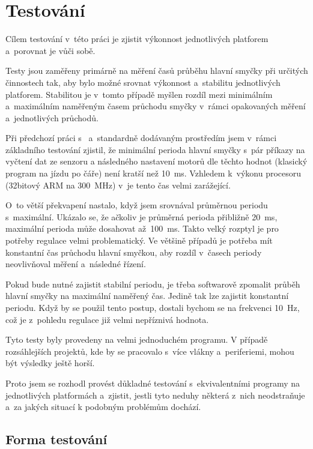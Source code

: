 \chapter{Testování}

Cílem testování v~této práci je zjistit výkonnost jednotlivých platforem a~porovnat je vůči sobě. 

Testy jsou zaměřeny primárně na měření časů průběhu hlavní smyčky při určitých činnostech tak, aby bylo možné srovnat výkonnost a~stabilitu jednotlivých platforem. 
Stabilitou je v~tomto případě myšlen rozdíl mezi minimálním a~maximálním naměřeným časem průchodu smyčky v~rámci opakovaných měření a~jednotlivých průchodů.

Při předchozí práci s~\EVthree{ } a~standardně dodávaným prostředím jsem v~rámci základního testování zjistil, že minimální perioda hlavní smyčky s~pár příkazy na vyčtení dat ze senzoru a následného nastavení motorů dle těchto hodnot (klasický program na jízdu po čáře) není kratší než 10~ms. 
Vzhledem k~výkonu procesoru (32bitový ARM na 300~MHz) v~\EVthree{ }je tento čas velmi zarážející. 

O~to větší překvapení nastalo, když jsem srovnával průměrnou periodu s~maximální. Ukázalo se, že ačkoliv je průměrná perioda přibližně 20~ms, maximální perioda může dosahovat až~100~ms. 
Takto velký rozptyl je pro potřeby regulace velmi problematický. 
Ve většině případů je potřeba mít konstantní čas průchodu hlavní smyčkou, aby rozdíl v~časech periody neovlivňoval měření a~následné řízení. 

Pokud bude nutné zajistit stabilní periodu, je třeba softwarově zpomalit průběh hlavní smyčky na maximální naměřený čas. 
Jedině tak lze zajistit konstantní periodu. 
Když by se použil tento postup, dostali bychom se na frekvenci 10~Hz, což je z~pohledu regulace již velmi nepříznivá hodnota.

Tyto testy byly provedeny na velmi jednoduchém programu. 
V případě rozsáhlejších projektů, kde by se pracovalo s~více vlákny a~periferiemi, mohou být výsledky ještě horší.


Proto jsem se rozhodl provést důkladné testování s~ekvivalentními programy na jednotlivých platformách a~zjistit, jestli tyto neduhy některá z~nich neodstraňuje a~za jakých situací k podobným problémům dochází.

\section{Forma testování}

